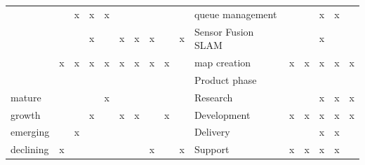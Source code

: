 \begin{table}[ht]
{\begin{tabular}{lllllllllll|l|l|l|l|l|}
\multicolumn{1}{l|}{} & \multicolumn{1}{l|}{} & \multicolumn{1}{l|}{x} & \multicolumn{1}{l|}{x} & \multicolumn{1}{l|}{x} & \multicolumn{1}{l|}{} & \multicolumn{1}{l|}{} & \multicolumn{1}{l|}{} & \multicolumn{1}{l|}{} & \multicolumn{1}{l|}{} & queue management &  &  & x & x &  \\ \cline{2-16} 
\multicolumn{1}{l|}{} & \multicolumn{1}{l|}{} & \multicolumn{1}{l|}{} & \multicolumn{1}{l|}{x} & \multicolumn{1}{l|}{} & \multicolumn{1}{l|}{x} & \multicolumn{1}{l|}{x} & \multicolumn{1}{l|}{x} & \multicolumn{1}{l|}{} & \multicolumn{1}{l|}{x} & Sensor Fusion SLAM &  &  & x &  &  \\ \cline{2-16} 
\multicolumn{1}{l|}{} & \multicolumn{1}{l|}{x} & \multicolumn{1}{l|}{x} & \multicolumn{1}{l|}{x} & \multicolumn{1}{l|}{x} & \multicolumn{1}{l|}{x} & \multicolumn{1}{l|}{x} & \multicolumn{1}{l|}{x} & \multicolumn{1}{l|}{x} & \multicolumn{1}{l|}{} & map creation & x & x & x & x & x \\ \cline{2-16} 
\multicolumn{1}{l|}{} & \multicolumn{1}{l|}{} & \multicolumn{1}{l|}{} & \multicolumn{1}{l|}{} & \multicolumn{1}{l|}{} & \multicolumn{1}{l|}{} & \multicolumn{1}{l|}{} & \multicolumn{1}{l|}{} & \multicolumn{1}{l|}{} & \multicolumn{1}{l|}{} & Product phase &  &  &  &  &  \\ \hline
\multicolumn{1}{|l|}{mature} & \multicolumn{1}{l|}{} & \multicolumn{1}{l|}{} & \multicolumn{1}{l|}{} & \multicolumn{1}{l|}{x} & \multicolumn{1}{l|}{} & \multicolumn{1}{l|}{} & \multicolumn{1}{l|}{} & \multicolumn{1}{l|}{} & \multicolumn{1}{l|}{} & Research &  &  & x & x & x \\ \hline
\multicolumn{1}{|l|}{growth} & \multicolumn{1}{l|}{} & \multicolumn{1}{l|}{} & \multicolumn{1}{l|}{x} & \multicolumn{1}{l|}{} & \multicolumn{1}{l|}{x} & \multicolumn{1}{l|}{x} & \multicolumn{1}{l|}{} & \multicolumn{1}{l|}{x} & \multicolumn{1}{l|}{} & Development & x & x & x & x & x \\ \hline
\multicolumn{1}{|l|}{emerging} & \multicolumn{1}{l|}{} & \multicolumn{1}{l|}{x} & \multicolumn{1}{l|}{} & \multicolumn{1}{l|}{} & \multicolumn{1}{l|}{} & \multicolumn{1}{l|}{} & \multicolumn{1}{l|}{} & \multicolumn{1}{l|}{} & \multicolumn{1}{l|}{} & Delivery &  &  & x & x &  \\ \hline
\multicolumn{1}{|l|}{declining} & \multicolumn{1}{l|}{x} & \multicolumn{1}{l|}{} & \multicolumn{1}{l|}{} & \multicolumn{1}{l|}{} & \multicolumn{1}{l|}{} & \multicolumn{1}{l|}{} & \multicolumn{1}{l|}{x} & \multicolumn{1}{l|}{} & \multicolumn{1}{l|}{x} & Support & x & x & x & x &  \\ \hline
\end{tabular}%
}
\end{table}

